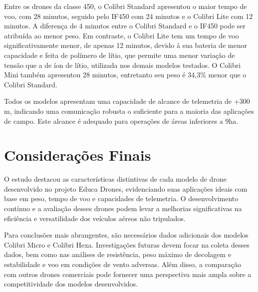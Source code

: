 \documentclass[conference]{IEEEtran}
\begin{document}
Entre os drones da classe 450, o Colibri Standard  apresentou o maior tempo de voo, com 28 minutos, seguido pelo IF450 com 24 minutos e o Colibri Lite com 12 minutos. A diferença de 4 minutos entre o Colibri Standard e o IF450 pode ser atribuída ao menor peso. Em contraste, o Colibri Lite tem um tempo de voo significativamente menor, de apenas 12 minutos, devido à sua bateria de menor capacidade e feita de polímero de lítio, que permite uma menor variação de tensão que a de íon de lítio, utilizada nos demais modelos testados. O Colibri Mini também apresentou 28 minutos, entretanto seu peso é 34,3\% menor que o Colibri Standard. 

Todos os modelos apresentam uma capacidade de alcance de telemetria de +300 m, indicando uma comunicação robusta o suficiente para a maioria das aplicações de campo. Este alcance é adequado para operações de áreas inferiores a 9ha.

\section*{Considerações Finais}

O estudo destacou as características distintivas de cada modelo de drone desenvolvido no projeto Educa Drones, evidenciando suas aplicações ideais com base em peso, tempo de voo e capacidades de telemetria. O desenvolvimento contínuo e a avaliação desses drones podem levar a melhorias significativas na eficiência e versatilidade dos veículos aéreos não tripulados.

Para conclusões mais abrangentes, são necessários dados adicionais dos modelos Colibri Micro e Colibri Hexa. Investigações futuras devem focar na coleta desses dados, bem como nas análises de resistência, peso máximo de decolagem e estabilidade e voo em condições de vento adversas. Além disso, a comparação com outros drones comerciais pode fornecer uma perspectiva mais ampla sobre a competitividade dos modelos desenvolvidos.
\end{document}
